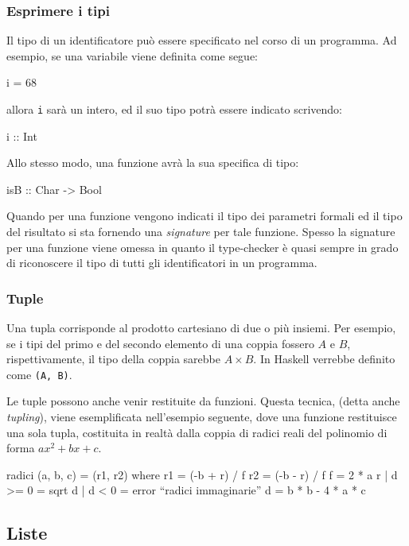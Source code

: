 \subsubsection{Esprimere i tipi}
Il tipo di un identificatore pu\`{o} essere specificato nel corso di un 
programma. Ad esempio, se una variabile viene definita come segue:
\begin{haskellCode}
i = 68
\end{haskellCode}
allora \verb"i" sar\`a un intero, ed il suo tipo potr\`a essere indicato 
scrivendo:
\begin{haskellCode}
i :: Int
\end{haskellCode}
Allo stesso modo, una funzione avr\`a la sua specifica di tipo: 
\begin{haskellCode}
isB :: Char -> Bool
\end{haskellCode}
Quando per una funzione vengono indicati il tipo dei parametri formali ed il tipo del risultato 
si sta fornendo una \emph{signature} per tale funzione.
  Spesso la signature per una funzione viene omessa in quanto 
 il type-checker \`e quasi sempre in grado di riconoscere il tipo di 
tutti gli identificatori in un programma.

\subsubsection{Tuple}
Una tupla corrisponde al prodotto cartesiano di due o pi\`u insiemi. Per 
esempio, se i tipi del primo e del secondo elemento di una coppia fossero 
$A$ e $B$, rispettivamente, il tipo della coppia sarebbe $A \times B$. In 
Haskell verrebbe definito come \verb"(A, B)".

Le tuple possono anche venir restituite da funzioni. Questa tecnica, (detta anche \emph{tupling}), viene 
esemplificata nell'esempio seguente, dove una funzione restituisce una 
sola tupla, costituita in realt\`a dalla coppia di radici reali del 
polinomio di forma $ax^{2}+bx+c$.
\begin{haskellCode}
radici (a, b, c) = (r1, r2)
    where
    r1          =  (-b + r) / f
    r2          =  (-b - r) / f
    f           =  2 * a
    r | d >= 0  =  sqrt d
      | d <  0  =  error ``radici immaginarie''
    d           =  b * b - 4 * a * c
\end{haskellCode}

\subsection{Liste}

